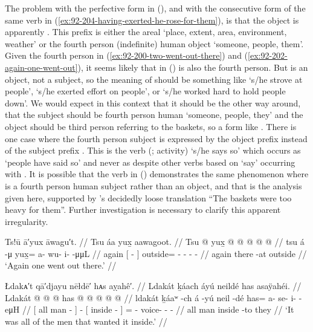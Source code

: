 The problem with the perfective form in (\lastx), and with the consecutive form of the same verb in (\ref{ex:92-204-having-exerted-he-rose-for-them}), is that the object is apparently .
This prefix is either the areal  ‘place, extent, area, environment, weather’ or the fourth person (indefinite) human object  ‘someone, people, them’.
Given the fourth person in (\ref{ex:92-200-two-went-out-there}) and (\ref{ex:92-202-again-one-went-out}), it seems likely that  in (\lastx) is also the fourth person.
But  is an object, not a subject, so the meaning of  should be something like ‘s/he strove at people’, ‘s/he exerted effort on people’, or ‘s/he worked hard to hold people down’.
We would expect in this context that it should be the other way around, that the subject should be fourth person human  ‘someone, people, they’ and the object should be third person referring to the baskets, so a form like .
There is one case where the fourth person subject is expressed by the object prefix  instead of the subject prefix .
This is the verb  (;  activity) ‘s/he says so’ which occurs as  ‘people have said so’ \parencite[217.3052]{story-naish:1973} and never as  despite other verbs based on  ‘say’ occurring with .
It is possible that the verb in (\lastx) demonstrates the same phenomenon where  is a fourth person human subject rather than an object, and that is the analysis given here, supported by \citeauthor{swanton:1909}’s decidedly loose translation “The baskets were too heavy for them”.
Further investigation is necessary to clarify this apparent irregularity.

\ex\label{ex:92-202-again-one-went-out}%
%
\begingl
	\glpreamble	Ts!ū ā′yux āwagu′t. //
	\glpreamble	Tsu áa yux̱ aawagoot. //
	\gla	Tsu {}  @ {} {} yux̱ @  @ {} @ {} @ {} @ {} //
	\glb	tsu {} á -μ {} yux̱= a- wu- i-  -μμL //
	\glc	again {}[  - {}]
		outside= - - -  - //
	\gld	again {} there -at {}
		outside  {} {} {} {} //
	\glft	‘Again one went out there.’
		//
\endgl
\xe

\ex\label{ex:92-203-all-men-willing-inside}%
%
\begingl
	\glpreamble	Łdakᴀ′t qā′djayu nēłdē′ hᴀs aỵahê′. //
	\glpreamble	Ldakát ḵáach áyú neildé has asaÿahéi. //
	\gla	{} Ldakát  @ {} {}  @ {}
		{}  @ {} {}
		has @  @ {} @ {} @ {} @ {} //
	\glb	{} ldakát ḵáaʷ -ch {} á -yú
		{} neil -dé {}
		has= a- se- i-  -eμH //
	\glc	{}[ all man - {}]  -
		{}[ inside - {}]
		= - voice- -  - //
	\gld	{} all man {} {}  {}
		{} inside -to {}
		they  {} {} {} {} //
	\glft	‘It was all of the men that wanted it inside.’
		//
\endgl
\xe

